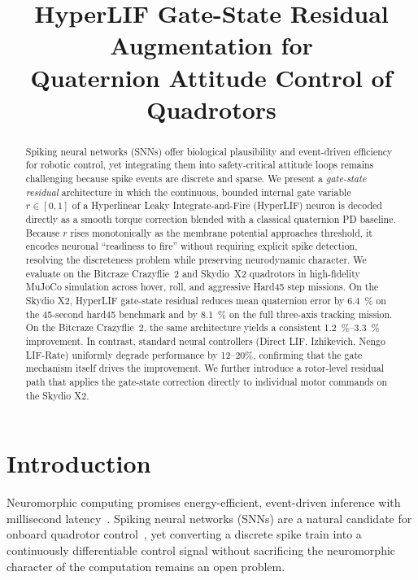 \documentclass[conference]{IEEEtran}
\title{HyperLIF Gate-State Residual Augmentation for\\Quaternion Attitude Control of Quadrotors}
\author{
  \IEEEauthorblockN{Author Name}
  \IEEEauthorblockA{Affiliation\\
    City, Country\\
    email@institution.edu}
}
\begin{document}
\maketitle

\begin{abstract}
Spiking neural networks (SNNs) offer biological plausibility and event-driven
efficiency for robotic control, yet integrating them into safety-critical attitude
loops remains challenging because spike events are discrete and sparse.
We present a \emph{gate-state residual} architecture in which the continuous,
bounded internal gate variable~$r \in [0,1]$ of a Hyperlinear Leaky
Integrate-and-Fire (HyperLIF) neuron is decoded directly as a smooth torque
correction blended with a classical quaternion PD baseline.
Because $r$ rises monotonically as the membrane potential approaches threshold,
it encodes neuronal ``readiness to fire'' without requiring explicit spike
detection, resolving the discreteness problem while preserving neurodynamic
character.
We evaluate on the Bitcraze Crazyflie~2 and Skydio~X2 quadrotors in
high-fidelity MuJoCo simulation across hover, roll, and aggressive Hard45 step
missions.
On the Skydio X2, HyperLIF gate-state residual reduces mean quaternion error
by \SI{6.4}{\percent} on the 45-second hard45 benchmark and by \SI{8.1}{\percent}
on the full three-axis tracking mission.
On the Bitcraze Crazyflie~2, the same architecture yields a consistent
\SI{1.2}{\percent}--\SI{3.3}{\percent} improvement.
In contrast, standard neural controllers (Direct LIF, Izhikevich, Nengo LIF-Rate)
uniformly degrade performance by 12--20\%, confirming that the gate mechanism
itself drives the improvement.
We further introduce a rotor-level residual path that applies the gate-state
correction directly to individual motor commands on the Skydio X2.
\end{abstract}

\section{Introduction}

Neuromorphic computing promises energy-efficient, event-driven inference with
millisecond latency~\cite{mahowald1991vlsi,furber2014spinnaker}.
Spiking neural networks (SNNs) are a natural candidate for onboard quadrotor
control~\cite{muller2022snn_uav}, yet converting a discrete spike train into a
continuously differentiable control signal without sacrificing the neuromorphic
character of the computation remains an open problem.
\end{document}
